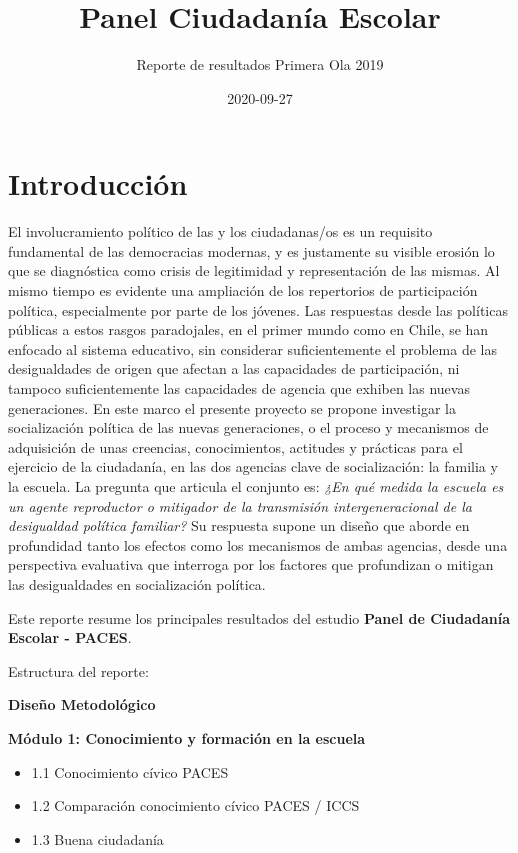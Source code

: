 \documentclass[
  14pt,
]{book}
\title{Panel Ciudadanía Escolar}
\subtitle{Reporte de resultados Primera Ola 2019}
\author{}
\date{\vspace{-2.5em}2020-09-27}
\providecommand{\tightlist}{%
  \setlength{\itemsep}{0pt}\setlength{\parskip}{0pt}}
\begin{document}
\maketitle

{
\setcounter{tocdepth}{1}
\tableofcontents
}
\hypertarget{introducciuxf3n}{%
\chapter*{Introducción}\label{introducciuxf3n}}

El involucramiento político de las y los ciudadanas/os es un requisito fundamental de las democracias modernas, y es justamente su visible erosión lo que se diagnóstica como crisis de legitimidad y representación de las mismas. Al mismo tiempo es evidente una ampliación de los repertorios de participación política, especialmente por parte de los jóvenes. Las respuestas desde las políticas públicas a estos rasgos paradojales, en el primer mundo como en Chile, se han enfocado al sistema educativo, sin considerar suficientemente el problema de las desigualdades de origen que afectan a las capacidades de participación, ni tampoco suficientemente las capacidades de agencia que exhiben las nuevas generaciones. En este marco el presente proyecto se propone investigar la socialización política de las nuevas generaciones, o el proceso y mecanismos de adquisición de unas creencias, conocimientos, actitudes y prácticas para el ejercicio de la ciudadanía, en las dos agencias clave de socialización: la familia y la escuela. La pregunta que articula el conjunto es: \emph{¿En qué medida la escuela es un agente reproductor o mitigador de la transmisión intergeneracional de la desigualdad política familiar?} Su respuesta supone un diseño que aborde en profundidad tanto los efectos como los mecanismos de ambas agencias, desde una perspectiva evaluativa que interroga por los factores que profundizan o mitigan las desigualdades en socialización política.

Este reporte resume los principales resultados del estudio \textbf{Panel de Ciudadanía Escolar - PACES}.

Estructura del reporte:

\textbf{Diseño Metodológico}

\textbf{Módulo 1: Conocimiento y formación en la escuela}

\begin{itemize}
\tightlist
\item
  1.1 Conocimiento cívico PACES
\item
  1.2 Comparación conocimiento cívico PACES / ICCS
\item
  1.3 Buena ciudadanía
\end{itemize}
\end{document}
